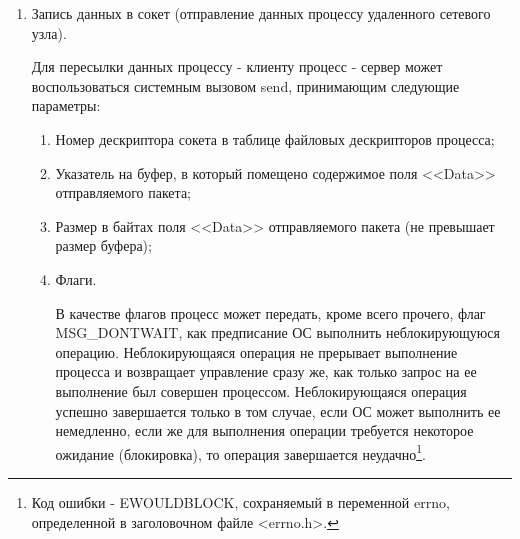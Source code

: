 \begin{enumerate}
			В качестве флагов системному вызову accept4 можно передать 0 и тогда системный вызов accept4 будет выполняться также, как и системный вызов accept,
			а можно передать значение константы SOCK\_NONBLOCK и тогда системный вызов accept4, в отличии от системного вызова accept, выполнит неблокирующуюся
			операцию - то есть проверит состояние очереди запросов на подключение и, если запросы в ней отсутствуют, не будет ожидать поступления запросов,
			как это сделал бы системный вызов accept, а вернет управление в вызывавший процесс сразу с сообщением о своем неудачном завершении\footnote{Переменная
			errno, определенная в заголовочном файле <errno.h>, будет установлена в значение кода ошибки EWOULDBLOCK.}.

			В случае своего успешного завершения системные вызовы accept и accept4 возвращают вызвавшему их процессу номер в таблице файловых дескрипторов
			данного процесса дескриптора сокета, через который будет осуществляться	обмен с процессом - клиентом. В случае неудачного завершения системные вызовы
			accept и accept4 возвращают -1.

			Библиотека GLIBC предоставляет обертки для данных системных вызовов, для использования которых необходимо включить в файл исходного кода программы
			заголовочные файлы <sys/types.h> и <sys/socket.h>. Для использования обертки к системному вызову accept4 в файле исходного кода программы
			перед включением в означенный файл заголовочного файла <sys/socket.h> необходимо определить константу компилятора <<\_GNU\_SOURCE>> с помощью
			директивы <<\#define>> препроцессора;
			
		\item Запись данных в сокет (отправление данных процессу удаленного сетевого узла).
		
			Для пересылки данных процессу - клиенту процесс - сервер может воспользоваться системным вызовом send, принимающим следующие параметры:

			\begin{enumerate}

				\item Номер дескриптора сокета в таблице файловых дескрипторов процесса;
				\item Указатель на буфер, в который помещено содержимое поля <<Data>> отправляемого пакета;
				\item Размер в байтах поля <<Data>> отправляемого пакета (не превышает размер буфера);
				\item Флаги.

					В качестве флагов процесс может передать, кроме всего прочего, флаг \linebreak MSG\_DONTWAIT, как предписание ОС выполнить неблокирующуюся
					операцию. Неблокирующаяся операция не прерывает выполнение процесса и возвращает управление сразу же, как только запрос на ее выполнение
					был совершен процессом. Неблокирующаяся операция успешно завершается только в том случае, если ОС может выполнить ее немедленно, если же
					для выполнения операции требуется некоторое ожидание (блокировка), то операция завершается неудачно\footnote{Код ошибки - EWOULDBLOCK,
					сохраняемый в переменной errno, определенной в заголовочном файле <errno.h>.}.


\end{enumerate}
\end{enumerate}
